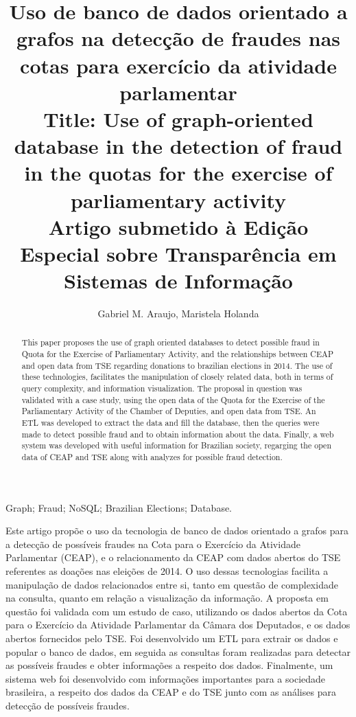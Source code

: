 \documentclass[12pt]{article}
\title{Uso de banco de dados orientado a grafos na detecção de fraudes nas cotas para exercício da atividade parlamentar\\
\medskip
Title: Use of graph-oriented database in the detection of fraud in the quotas for the exercise of parliamentary activity\\
\medskip
Artigo submetido à Edição Especial sobre Transparência em Sistemas de Informação}
\author{Gabriel M. Araujo\inst{1}, Maristela Holanda\inst{1}}
\begin{document}
 
\maketitle
\thispagestyle{plain}


\begin{abstract}
  This paper proposes the use of graph oriented databases to detect possible fraud in Quota for
the Exercise of Parliamentary Activity, and the relationships between CEAP and open data from TSE regarding donations to brazilian elections in 2014. The use
of these technologies, facilitates the manipulation of closely related data, both in
terms of query complexity, and information visualization. The proposal in question was
validated with a case study, using the open data of the Quota for the Exercise of the
Parliamentary Activity of the Chamber of Deputies, and open data from TSE. An ETL was developed to extract
the data and fill the database, then the queries were made to detect possible fraud and to obtain information about the data. Finally, a web system was developed with useful information for Brazilian society, regarging the open data of CEAP and TSE along with analyzes for possible fraud detection.
\end{abstract}

\begin{keywords}
Graph; Fraud; NoSQL; Brazilian Elections; Database.
\end{keywords}

\begin{resumo} 
  Este artigo propõe o uso da tecnologia de banco de dados orientado a grafos para a
detecção de possíveis fraudes na Cota para o Exercício da Atividade Parlamentar (CEAP), e o relacionamento da CEAP com dados abertos do TSE referentes as doações nas eleições de 2014. O uso dessas tecnologias facilita a manipulação de dados relacionados entre si, tanto em questão de complexidade na consulta, quanto em
relação a visualização da informação. A proposta em questão foi validada com um estudo
de caso, utilizando os dados abertos da Cota para o Exercício da Atividade Parlamentar da
Câmara dos Deputados, e os dados abertos fornecidos pelo TSE. Foi desenvolvido um ETL para extrair os dados e popular o banco de dados,
em seguida as consultas foram realizadas para detectar as possíveis fraudes e obter informações a respeito dos dados. Finalmente, um sistema web foi desenvolvido com informações importantes para a sociedade brasileira, a respeito dos dados da CEAP e do TSE junto com as análises para detecção de possíveis fraudes.
\end{resumo}
\end{document}
